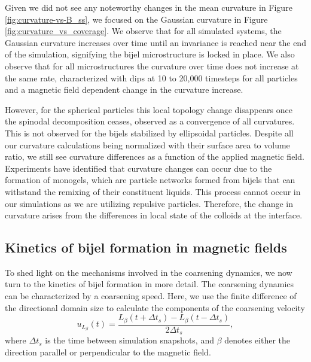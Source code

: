 Given we did not see any noteworthy changes in the mean curvature in
Figure \ref{fig:curvature-vs-B_ss}, we focused on the Gaussian curvature
in Figure \ref{fig:curvature_vs_coverage}. We observe that for all
simulated systems, the Gaussian curvature increases over time until an
invariance is reached near the end of the simulation, signifying the
bijel microstructure is locked in place. We also observe that for all
microstructures the curvature over time does not increase at the same
rate, characterized with dips at 10 to 20,000 timesteps for all
particles and a magnetic field dependent change in the curvature
increase.

However, for the spherical particles this local topology change
disappears once the spinodal decomposition ceases, observed as a
convergence of all curvatures. This is not observed for the bijels
stabilized by ellipsoidal particles. Despite all our curvature
calculations being normalized with their surface area to volume ratio,
we still see curvature differences as a function of the applied magnetic
field. Experiments have identified that curvature changes can occur due
to the formation of monogels, which are particle networks formed from
bijels that can withstand the remixing of their constituent liquids.
\cite{sanz_colloidal_2009, lee_making_2013} This process cannot occur in
our simulations as we are utilizing repulsive particles. Therefore, the
change in curvature arises from the differences in local state of the
colloids at the interface.

\subsection{Kinetics of bijel formation in magnetic fields}

To shed light on the mechanisms involved in the coarsening dynamics,
we now turn to the kinetics of bijel formation in more detail. The
coarsening dynamics can be characterized by a coarsening speed. Here,
we use the finite difference of the directional domain size to
calculate the components of the coarsening velocity
%
\begin{equation}
u_{L_\beta}(t) = \frac{L_\beta(t+\Delta t_s)-L_\beta(t-\Delta t_s)}{2\Delta t_s} ,
\end{equation}
%
where \(\Delta t_s\) is the time between simulation
snapshots, and $\beta$ denotes either the direction parallel or perpendicular to the magnetic field.

